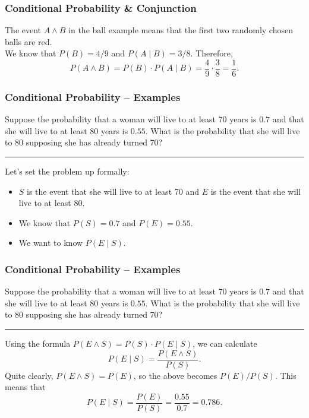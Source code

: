 \documentclass[aspectratio=169,11pt,usenames,dvipsnames,handout]{beamer}
\begin{document}
\begin{frame}
 \frametitle{Conditional Probability \& Conjunction}
 \begin{center}
 \end{center}
 The event $A \wedge B$ in the ball example means that the first two randomly
 chosen balls are red.\pause\\
 We know that $P(B) = 4 / 9$ and $P(A \mid B) = 3 / 8$. Therefore,
 \[
  P(A \wedge B) = P(B) \cdot P(A \mid B) = \frac{4}{9} \cdot \frac{3}{8} =
  \frac{1}{6}.
 \]
\end{frame}
\begin{frame}
 \frametitle{Conditional Probability -- Examples}
 Suppose the probability that a woman will live to at least 70 years is $0.7$
 and that she will live to at least 80 years is $0.55$. What is the probability
 that she will live to 80 supposing she has already turned 70?\pause\\
 \vspace*{1em}
 \hrule
 Let's set the problem up formally:
 \begin{itemize}
  \item $S$ is the event that she will live to at least 70 and $E$ is the event
   that she will live to at least 80.
  \pause
  \item We know that $P(S) = 0.7$ and $P(E) = 0.55$.
  \pause
  \item We want to know $P(E \mid S)$.
 \end{itemize}
\end{frame}

\begin{frame}
 \frametitle{Conditional Probability -- Examples}
 Suppose the probability that a woman will live to at least 70 years is $0.7$
 and that she will live to at least 80 years is $0.55$. What is the probability
 that she will live to 80 supposing she has already turned 70?\\
 \vspace*{1em}
 \hrule
 Using the formula $P(E \wedge S) = P(S) \cdot P(E \mid S)$, we can calculate
 \[
  P(E \mid S) = \frac{P(E \wedge S)}{P(S)}.
 \]
 \pause
 Quite clearly, $P(E \wedge S) = P(E)$, so the above becomes $P(E) /
 P(S)$. \pause
 This means that
 \[
  P(E \mid S) = \frac{P(E)}{P(S)} = \frac{0.55}{0.7} = 0.786.
 \]
\end{frame}
\end{document}
